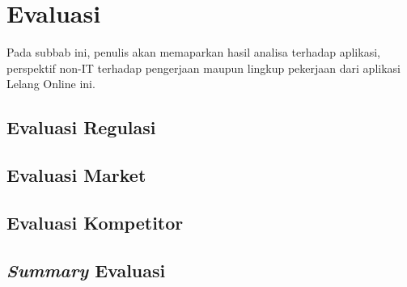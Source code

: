 \section{Evaluasi}
	Pada subbab ini, penulis akan memaparkan hasil analisa terhadap aplikasi, perspektif non-IT terhadap pengerjaan maupun lingkup pekerjaan dari aplikasi Lelang Online ini.
	
	\subsection{Evaluasi Regulasi}
	
	
	\subsection{Evaluasi Market}
	

	\subsection{Evaluasi Kompetitor}
	
	\subsection{\textit{Summary} Evaluasi}